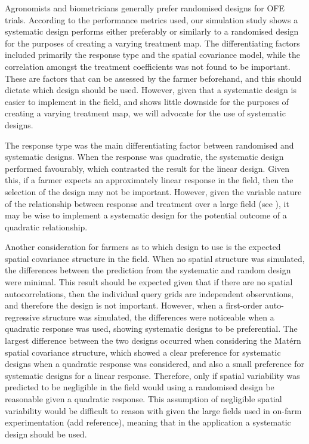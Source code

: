 \documentclass[a4paper]{article} 	%
\newcommand{\Matern}{Mat\'ern }
\begin{document}
Agronomists and biometricians generally prefer randomised designs for OFE trials. According to the performance metrics used, our simulation study shows a systematic design performs either preferably or similarly to a randomised design for the purposes of creating a varying treatment map. The differentiating factors included primarily the response type and the spatial covariance model, while the correlation amongst the treatment coefficients was not found to be important. These are factors that can be assessed by the farmer beforehand, and this should dictate which design should be used. However, given that a systematic design is easier to implement in the field, and shows little downside for the purposes of creating a varying treatment map, we will advocate for the use of systematic designs. 

The response type was the main differentiating factor between randomised and systematic designs. When the response was quadratic, the systematic design performed favourably, which contrasted the result for the linear design. Given this, if a farmer expects an approximately linear response in the field, then the selection of the design may not be important. However, given the variable nature of the relationship between response and treatment over a large field (see \textcite{Rakshit2020Novel}), it may be wise to implement a systematic design for the potential outcome of a quadratic relationship. 

Another consideration for farmers as to which design to use is the expected spatial covariance structure in the field. When no spatial structure was simulated, the differences between the prediction from the systematic and random design were minimal. This result should be expected given that if there are no spatial autocorrelations, then the individual query grids are independent observations, and therefore the design is not important. However, when a first-order auto-regressive structure was simulated, the differences were noticeable when a quadratic response was used, showing systematic designs to be preferential. The largest difference between the two designs occurred when considering the \Matern spatial covariance structure, which showed a clear preference for systematic designs when a quadratic response was considered, and also a small preference for systematic designs for a linear response. Therefore, only if spatial variability was predicted to be negligible in the field would using a randomised design be reasonable given a quadratic response. This assumption of negligible spatial variability would be difficult to reason with given the large fields used in on-farm experimentation (add reference), meaning that in the application a systematic design should be used. 
\end{document}
